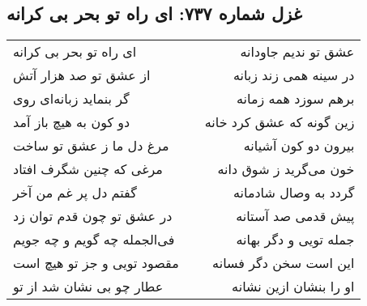 \begin{center}
\section*{غزل شماره ۷۳۷: ای راه تو بحر بی کرانه}
\label{sec:737}
\begin{longtable}{l p{0.5cm} r}
ای راه تو بحر بی کرانه
&&
عشق تو ندیم جاودانه
\\
از عشق تو صد هزار آتش
&&
در سینه همی زند زبانه
\\
گر بنماید زبانه‌ای روی
&&
برهم سوزد همه زمانه
\\
دو کون به هیچ باز آمد
&&
زین گونه که عشق کرد خانه
\\
مرغ دل ما ز عشق تو ساخت
&&
بیرون دو کون آشیانه
\\
مرغی که چنین شگرف افتاد
&&
خون می‌گرید ز شوق دانه
\\
گفتم دل پر غم من آخر
&&
گردد به وصال شادمانه
\\
در عشق تو چون قدم توان زد
&&
پیش قدمی صد آستانه
\\
فی‌الجمله چه گویم و چه جویم
&&
جمله تویی و دگر بهانه
\\
مقصود تویی و جز تو هیچ است
&&
این است سخن دگر فسانه
\\
عطار چو بی نشان شد از تو
&&
او را بنشان ازین نشانه
\\
\end{longtable}
\end{center}
